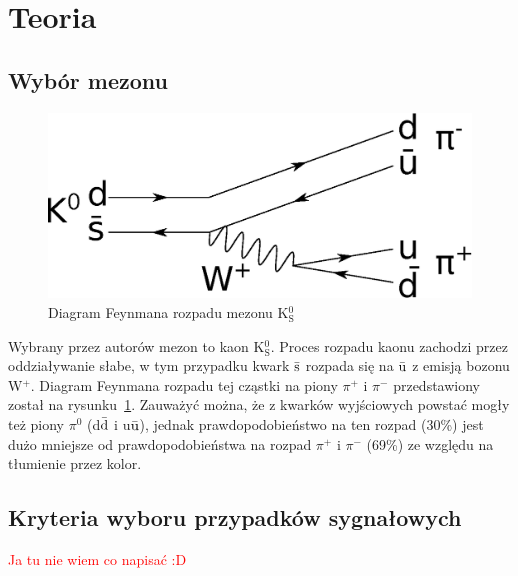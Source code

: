 \section{Teoria}
\subsection{Wybór mezonu}

\begin{figure}[H]
\centering
\includegraphics[width=.5\textwidth]{./img/Rysunek}
\caption{Diagram Feynmana rozpadu mezonu K$^0_\text{S}$}
\label{img:feynman}
\end{figure}

Wybrany przez autorów mezon to kaon K$^0_\text{S}$. Proces rozpadu kaonu zachodzi przez oddziaływanie słabe, w tym przypadku
kwark $\bar{\text s}$ rozpada się na $\bar{\text u}$ z emisją bozonu W$^+$.
Diagram Feynmana rozpadu tej cząstki na piony $\pi^+$ i $\pi^-$ przedstawiony został na rysunku~\ref{img:feynman}.
Zauważyć można, że z kwarków wyjściowych powstać mogły też piony $\pi^0$ (d$\bar{\text d}$ i u$\bar{\text u}$), jednak 
prawdopodobieństwo na ten rozpad (30\%\cite{database:K}) jest dużo mniejsze od prawdopodobieństwa na rozpad 
$\pi^+$ i $\pi^-$ (69\%\cite{database:K}) ze względu na tłumienie przez kolor.

\subsection{Kryteria wyboru przypadków sygnałowych}
\textcolor{red}{Ja tu nie wiem co napisać :D}
